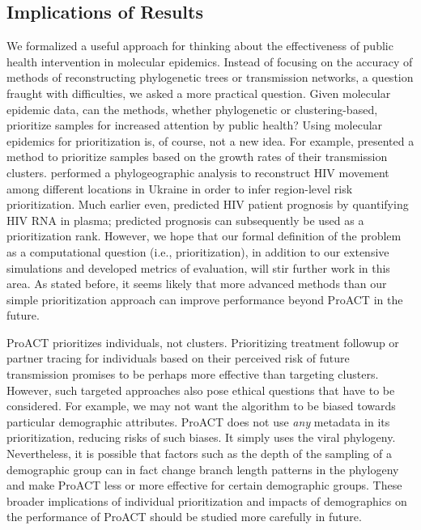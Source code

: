 \documentclass[oupdraft]{sysbio}
\newcommand{\PLWH}{sample\xspace}
\begin{document}
\subsection{Implications of Results}

We formalized a useful approach for thinking about the effectiveness of public health intervention in molecular epidemics. 
Instead of focusing on the accuracy of methods of reconstructing phylogenetic trees or transmission networks, a question fraught with difficulties, we asked a more practical question. 
Given molecular epidemic data, can the methods, whether phylogenetic or clustering-based, prioritize \PLWH{s} for increased attention by public health?
Using molecular epidemics for prioritization is, of course, not a new idea. For example, \citet{Wertheim2018} presented a method to prioritize \PLWH{s} based on the growth rates of their transmission clusters.
\citet{Vasylyeva2018} performed a phylogeographic analysis to reconstruct HIV movement among different locations in Ukraine in order to infer region-level risk prioritization.
Much earlier even, \citet{Mellors1996} predicted HIV patient prognosis by quantifying HIV RNA in plasma; predicted prognosis can subsequently be used as a prioritization rank.
However, we hope that our formal definition of the problem as a computational question (i.e., prioritization), in addition to our extensive simulations and developed metrics of evaluation, will stir further work in this area. 
As stated before, it seems likely that more advanced methods than our simple prioritization approach can improve performance beyond ProACT in the future. 



ProACT prioritizes individuals, not clusters.
Prioritizing treatment followup or partner tracing for individuals based on their perceived risk of future transmission promises to be perhaps more effective than targeting clusters.
However, such targeted approaches also pose ethical questions that 
have to be considered. 
For example, we may not want the algorithm to be biased towards particular demographic attributes. 
ProACT does not use {\em any} metadata in its prioritization, reducing risks of such biases. 
It simply uses the viral phylogeny.
Nevertheless, it is possible that factors such as the depth of the sampling of a demographic group can in fact change branch length patterns in the phylogeny and make ProACT less or more effective for certain demographic groups. 
These broader implications of individual prioritization and impacts of demographics on the performance of ProACT should be studied more carefully in future. 
\end{document}
